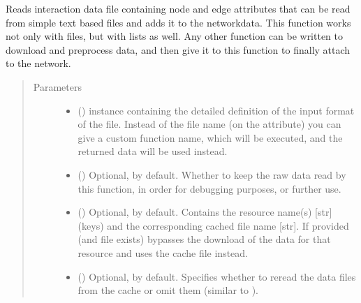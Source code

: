 \documentclass[letterpaper,10pt,english]{sphinxmanual}
\begin{document}
\begin{fulllineitems}

\begin{fulllineitems}
\label{\detokenize{reference:pypath.main.PyPath.read_data_file}}
Reads interaction data file containing node and edge attributes
that can be read from simple text based files and adds it to the
networkdata. This function works not only with files, but with
lists as well. Any other function can be written to download and
preprocess data, and then give it to this function to finally
attach to the network.
\begin{quote}\begin{description}
\item[{Parameters}] \leavevmode\begin{itemize}
\item {} 
 () \textendash{}  instance
containing the detailed definition of the input format of
the file. Instead of the file name (on the
attribute) you can give a custom function name, which will
be executed, and the returned data will be used instead.

\item {} 
 () \textendash{} Optional,  by default. Whether to keep the raw data
read by this function, in order for debugging purposes, or
further use.

\item {} 
 () \textendash{} Optional, \sphinxcode{\sphinxupquote{\{\}}} by default. Contains the resource name(s)
{[}str{]} (keys) and the corresponding cached file name {[}str{]}.
If provided (and file exists) bypasses the download of the
data for that resource and uses the cache file instead.

\item {} 
 () \textendash{} Optional,  by default. Specifies whether to reread
the data files from the cache or omit them (similar to
).


\end{itemize}
\end{description}
\end{quote}
\end{fulllineitems}
\end{fulllineitems}
\end{document}
